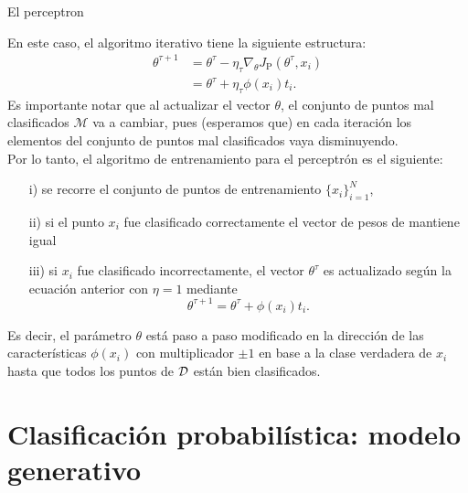 \documentclass[9pt]{beamer}
\begin{document}
\begin{frame}{El perceptron}

En este caso, el algoritmo iterativo tiene la siguiente estructura: \pause
\begin{align*}
  \theta^{\tau+1} &= \theta^\tau - \eta_\tau \nabla_\theta J_\text{P}(\theta^\tau,x_i)\nonumber\\
  &= \theta^\tau + \eta_\tau \phi(x_i)t_i.\label{eq:percetron_rule}
\end{align*}\pause
Es importante notar que al actualizar el vector $\theta$, el conjunto de puntos mal clasificados $\mathcal{M}$ va a cambiar, pues (esperamos que) en cada iteración los elementos del conjunto de puntos mal clasificados vaya disminuyendo.\\

Por lo tanto, el algoritmo de entrenamiento para el perceptrón es el siguiente: \pause

\begin{itemize}
  \item[i)] se recorre el conjunto de puntos de entrenamiento $\{x_i\}_{i=1}^N$, \pause
  \item[ii)] si el punto $x_i$ fue clasificado correctamente el vector de pesos de mantiene igual \pause
  \item[iii)] si $x_i$ fue clasificado incorrectamente, el vector $\theta^\tau$ es actualizado según la ecuación anterior con $\eta=1$ mediante
  \begin{equation*}
   \theta^{\tau+1} = \theta^\tau + \phi(x_i)t_i.
  \end{equation*} 
\end{itemize}
\pause
Es decir, el parámetro $\theta$ está paso a paso modificado en la dirección de las características $\phi(x_i)$ con multiplicador $\pm1$ en base a la clase verdadera de $x_i$ hasta  que todos los puntos de ${\mathcal D}$ están bien clasificados.


\end{frame}
\section{Clasificación probabilística: modelo generativo}


\end{document}
